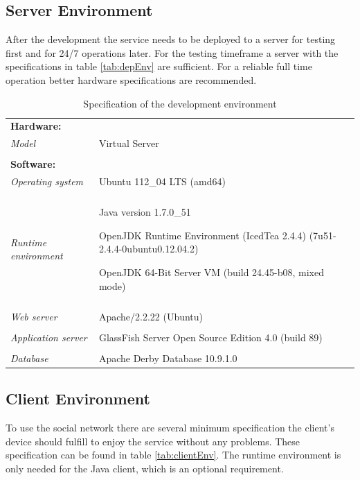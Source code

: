 \documentclass[11pt,a4paper]{report}
\begin{document}
\subsection{Server Environment}
After the development the service needs to be deployed to a server for testing first and for 24/7 operations later. For the testing timeframe a server with the specifications in table \vref{tab:depEnv} are sufficient. For a reliable full time operation better hardware specifications are recommended.
\begin{table}[h!]
    \begin{tabularx}{\textwidth}{l | X}
        \textbf{Hardware:} & \\
        \emph{Model} & Virtual Server \\
        \\
        \textbf{Software:} & \\
        \emph{Operating system} & Ubuntu 112\_04 LTS (amd64)\\
        \\
        \emph{Runtime environment} & Java version 1.7.0\_51
        
        OpenJDK Runtime Environment (IcedTea 2.4.4) (7u51-2.4.4-0ubuntu0.12.04.2)
        
        OpenJDK 64-Bit Server VM (build 24.45-b08, mixed mode)\\
        \\
        \emph{Web server} & Apache/2.2.22 (Ubuntu)\\
        \\
        \emph{Application server} & GlassFish Server Open Source Edition  4.0  (build 89) \\
        \\
        \emph{Database} & Apache Derby Database 10.9.1.0 \\
    \end{tabularx}
\caption{Specification of the development environment}
\label{tab:depEnv}
\end{table}

\subsection{Client Environment}
To use the social network there are several minimum specification the client's device should fulfill to enjoy the service without any problems. These specification can be found in table \vref{tab:clientEnv}. The runtime environment is only needed for the Java client, which is an optional requirement. 
\end{document}
